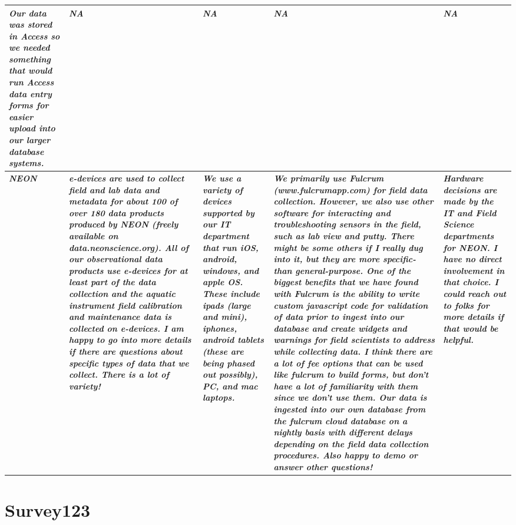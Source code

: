 \documentclass[
]{book}
\theoremstyle{definition}
\theoremstyle{definition}
\theoremstyle{definition}
\theoremstyle{definition}
\theoremstyle{remark}
\begin{document}
\begin{table}
\begin{tabular}[t]{>{\raggedright\arraybackslash}p{4.5cm}|>{\raggedright\arraybackslash}p{4.5cm}|>{\raggedright\arraybackslash}p{4.5cm}|>{\raggedright\arraybackslash}p{4.5cm}|>{\raggedright\arraybackslash}p{4.5cm}}
\em{\textbf{Our data was stored in Access so we needed something that would run Access data entry forms for easier upload into our larger database systems.}} & \em{\textbf{NA}} & \em{\textbf{NA}} & \em{\textbf{NA}} & \em{\textbf{NA}}\\
\hline
\em{\textbf{NEON}} & \em{\textbf{e-devices are used to collect field and lab data and metadata for about 100 of over 180 data products produced by NEON (freely available on data.neonscience.org). All of our observational data products use e-devices for at least part of the data collection and the aquatic instrument field calibration and maintenance data is collected on e-devices. I am happy to go into more details if there are questions about specific types of data that we collect. There is a lot of variety!}} & \em{\textbf{We use a variety of devices supported by our IT department that run iOS, android, windows, and apple OS. These include ipads (large and mini), iphones, android tablets (these are being phased out possibly), PC, and mac laptops.}} & \em{\textbf{We primarily use Fulcrum (www.fulcrumapp.com) for field data collection. However, we also use other software for interacting and troubleshooting sensors in the field, such as lab view and putty. There might be some others if I really dug into it, but they are more specific- than general-purpose. One of the biggest benefits that we have found with Fulcrum is the ability to write custom javascript code for validation of data prior to ingest into our database and create widgets and warnings for field scientists to address while collecting data. I think there are a lot of fee options that can be used like fulcrum to build forms, but don't have a lot of familiarity with them since we don't use them. Our data is ingested into our own database from the fulcrum cloud database on a nightly basis with different delays depending on the field data collection procedures. Also happy to demo or answer other questions!}} & \em{\textbf{Hardware decisions are made by the IT and Field Science departments for NEON. I have no direct involvement in that choice. I could reach out to folks for more details if that would be helpful.}}\\
\hline
\end{tabular}
\end{table}

\hypertarget{survey123}{%
\section{Survey123}\label{survey123}}
\end{document}
